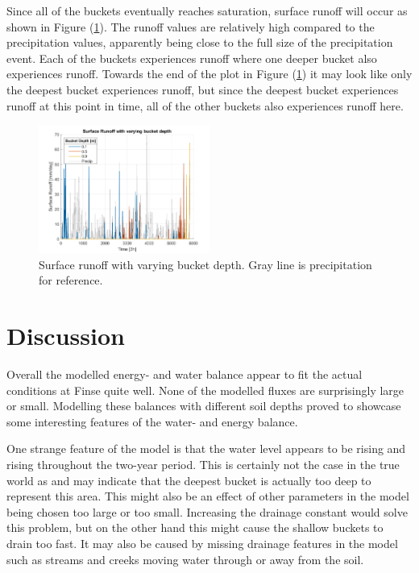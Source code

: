 \documentclass[a4paper,11pt,twocolumn]{article}
\begin{document}
Since all of the buckets eventually reaches saturation, surface runoff will occur as shown in Figure (\ref{fig:runoff}). The runoff values are relatively high compared to the precipitation values, apparently being close to the full size of the precipitation event. Each of the buckets experiences runoff where one deeper bucket also experiences runoff. Towards the end of the plot in Figure (\ref{fig:runoff}) it may look like only the deepest bucket experiences runoff, but since the deepest bucket experiences runoff at this point in time, all of the other buckets also experiences runoff here.  

\begin{figure}[h]
	\centering 
	\includegraphics[width=0.5\textwidth]{figures/runoff}
	\caption{Surface runoff with varying bucket depth. Gray line is precipitation for reference.}
	\label{fig:runoff}
\end{figure} 

\section{Discussion}

Overall the modelled energy- and water balance appear to fit the actual conditions at Finse quite well. None of the modelled fluxes are surprisingly large or small. Modelling these balances with different soil depths proved to showcase some interesting features of the water- and energy balance.  

One strange feature of the model is that the water level appears to be rising and rising throughout the two-year period. This is certainly not the case in the true world as and may indicate that the deepest bucket is actually too deep to represent this area. This might also be an effect of other parameters in the model being chosen too large or too small. Increasing the drainage constant would solve this problem, but on the other hand this might cause the shallow buckets to drain too fast. It may also be caused by missing drainage features in the model such as streams and creeks moving water through or away from the soil. 
\end{document}
